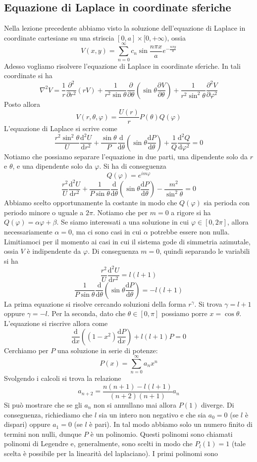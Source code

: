 \documentclass[a4paper,11pt]{book}
\newcommand{\dif}{\mathrm{d}}
\newcommand{\der}[3][]{\frac{\partial ^{#1}#2}{\partial {#3}^{#1}}}
\let\oldnabla\nabla
\renewcommand{\nabla}{\vec{\oldnabla}}
\newcommand{\lap}{\oldnabla^2}
\renewcommand{\vec}[1]{\mathbf{#1}}
\theoremstyle{theorem}
\theoremstyle{definition}
\begin{document}
\subsection{Equazione di Laplace in coordinate sferiche}
Nella lezione precedente abbiamo visto la soluzione dell'equazione di Laplace in coordinate cartesiane su una striscia $[0,a]\times[0,+\infty)$, ossia
\[V(x,y)=\sum_{n=0}^{\infty}c_n\sin\frac{n\pi x}{a}e^{-\frac{n\pi y}{a}}\]
Adesso vogliamo risolvere l'equazione di Laplace in coordinate sferiche. In tali coordinate si ha
\[\lap V=\frac{1}{r}\der[2]{}{r}\left(rV\right)+\frac{1}{r^2\sin\theta}\der{}{\theta}\left(\sin\theta\der{V}{\theta}\right)+\frac{1}{r^2\sin^2\theta}\der[2]{V}{\varphi}\]
Posto allora
\[V(r,\theta,\varphi)=\frac{U(r)}{r}P(\theta)Q(\varphi)\]
L'equazione di Laplace si scrive come
\[\frac{r^2\sin^2\theta}{U}\frac{\dif^2U}{\dif r^2}+\frac{\sin\theta}{P}\frac{\dif}{\dif\theta}\left(\sin\theta\frac{\dif P}{\dif\theta}\right)+\frac{1}{Q}\frac{\dif^2Q}{\dif\varphi^2}=0\]
Notiamo che possiamo separare l'equazione in due parti, una dipendente solo da $r$ e $\theta$, e una dipendente solo da $\varphi$. Si ha di conseguenza
\[Q(\varphi)=e^{im\varphi}\]
\[\frac{r^2}{U}\frac{\dif^2U}{\dif r^2}+\frac{1}{P\sin\theta}\frac{\dif}{\dif\theta}\left(\sin\theta\frac{\dif P}{\dif \theta}\right)-\frac{m^2}{\sin^2\theta}=0\]
Abbiamo scelto opportunamente la costante in modo che $Q(\varphi)$ sia perioda con periodo minore o uguale a $2\pi$. Notiamo che per $m=0$ a rigore si ha $Q(\varphi)=\alpha\varphi+\beta$. Se siamo interessati a una soluzione in cui $\varphi\in[0,2\pi]$, allora necessariamente $\alpha=0$, ma ci sono casi in cui $\alpha$ potrebbe essere non nulla. Limitiamoci per il momento ai casi in cui il sistema gode di simmetria azimutale, ossia $V$ è indipendente da $\varphi$. Di conseguenza $m=0$, quindi separando le variabili si ha
\[\frac{r^2}{U}\frac{\dif^2U}{\dif r^2}=l(l+1)\]
\[\frac{1}{P\sin\theta}\frac{\dif}{\dif\theta}\left(\sin\theta\frac{\dif P}{\dif \theta}\right)=-l(l+1)\]
La prima equazione si risolve cercando soluzioni della forma $r^\gamma$. Si trova $\gamma=l+1$ oppure $\gamma=-l$. Per la seconda, dato che $\theta\in[0,\pi]$ possiamo porre $x=\cos\theta$. L'equazione si riscrive allora come
\[\frac{\dif}{\dif x}\left((1-x^2)\frac{\dif P}{\dif x}\right)+l(l+1)P=0\]
Cerchiamo per $P$ una soluzione in serie di potenze:
\[P(x)=\sum_{n=0}^{\infty}a_nx^n\]
Svolgendo i calcoli si trova la relazione
\[a_{n+2}=\frac{n(n+1)-l(l+1)}{(n+2)(n+1)}a_n\]
Si può mostrare che se gli $a_n$ non si annullano mai allora $P(1)$ diverge. Di conseguenza, richiediamo che $l$ sia un intero non negativo e che sia $a_0=0$ (se $l$ è dispari) oppure $a_1=0$ (se $l$ è pari). In tal modo abbiamo solo un numero finito di termini non nulli, dunque $P$ è un polinomio. Questi polinomi sono chiamati polinomi di Legendre e, generalmente, sono scelti in modo che $P_l(1)=1$ (tale scelta è possibile per la linearità del laplaciano). I primi polinomi sono
\end{document}
